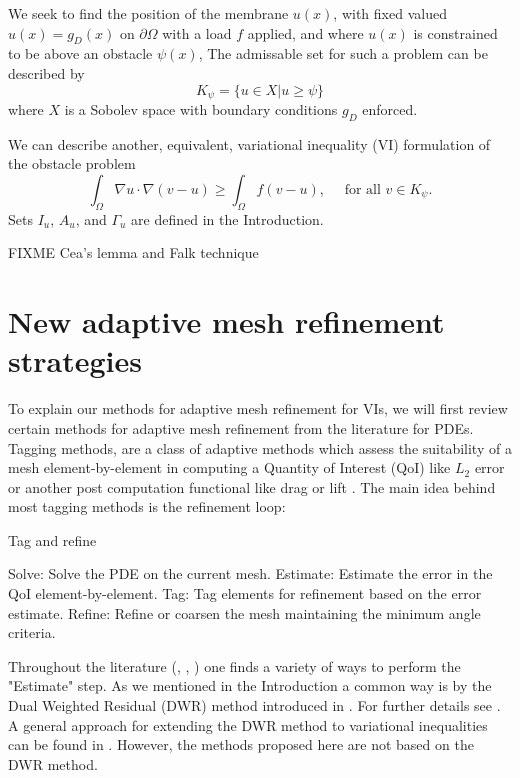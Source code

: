 \documentclass[]{interact}
\theoremstyle{plain}%
\theoremstyle{definition}
\theoremstyle{remark}
\begin{document}
We seek to find the position of the membrane $u(x)$, with fixed valued $u(x) = g_D(x)$ on $\partial \Omega$ with a load $f$ applied, and where $u(x)$ is constrained to be above an obstacle $\psi(x)$, 
The admissable set for such a problem can be described by 
  \begin{equation}
    K_\psi = \{u \in X| u \geq \psi \}
  \end{equation}
  where $X$ is a Sobolev space with boundary conditions $g_D$ enforced. 
  
  We can describe another, equivalent, variational inequality (VI) formulation of the obstacle problem 
  \begin{equation}
    \int_\Omega \nabla u \cdot \nabla(v - u) \geq \int_\Omega f(v - u), \quad \text{ for all } v \in K_\psi.
  \end{equation} 
Sets $I_u$, $A_u$, and $\Gamma_u$ are defined in the Introduction.

FIXME Cea's lemma and Falk technique



\section{New adaptive mesh refinement strategies} \label{sec:viamr}

To explain our methods for adaptive mesh refinement for VIs, we will first review certain methods for adaptive mesh refinement from the literature for PDEs.  Tagging methods, are a class of adaptive methods which assess the suitability of a mesh element-by-element in computing a Quantity of Interest (QoI) like $L_2$ error or another post computation functional like drag or lift \cite{bangerth_adaptive_2003}. The main idea behind most tagging methods is the refinement loop:

\begin{algorithm}
  \caption{Tag and refine}
  \begin{algorithmic}
    \State Solve: Solve the PDE on the current mesh. 
    \State Estimate: Estimate the error in the QoI element-by-element.
    \State Tag: Tag elements for refinement based on the error estimate.
    \State Refine: Refine or coarsen the mesh maintaining the minimum angle criteria.
  \end{algorithmic}
\end{algorithm}

Throughout the literature (\citet{becker_feed-back_1996}, \citet{bangerth_adaptive_2003}, \citet{suttmeier_numerical_2008}) one finds a variety of ways to perform the "Estimate" step. As we mentioned in the Introduction a common way is by the Dual Weighted Residual (DWR) method introduced in \citet{becker_feed-back_1996}. For further details see \citet[Chapter 3]{bangerth_adaptive_2003}. A general approach for extending the DWR method to variational inequalities can be found in \citet{suttmeier_numerical_2008}.  However, the methods proposed here are not based on the DWR method. 
\end{document}
